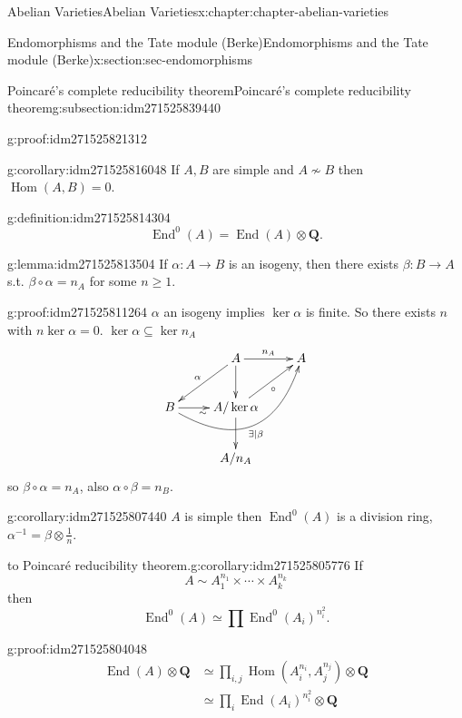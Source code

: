\documentclass[oneside,10pt,]{book}
\numberwithin{equation}{section}
\newcommand{\QQ}{\mathbf{Q}}
\DeclareMathOperator{\End}{End}
\DeclareMathOperator{\Hom}{Hom}
\newcommand{\amp}{&}
\begin{document}
\begin{chapterptx}{Abelian Varieties}{}{Abelian Varieties}{}{}{x:chapter:chapter-abelian-varieties}
\begin{sectionptx}{Endomorphisms and the Tate module (Berke)}{}{Endomorphisms and the Tate module (Berke)}{}{}{x:section:sec-endomorphisms}
\begin{subsectionptx}{Poincaré's complete reducibility theorem}{}{Poincaré's complete reducibility theorem}{}{}{g:subsection:idm271525839440}
\begin{proofptx}{}{g:proof:idm271525821312}
\end{proofptx}
\begin{corollary}{}{}{g:corollary:idm271525816048}%
If \(A,B\) are simple and  \(A\not\sim B\) then \(\Hom(A,B) = 0\).%
\end{corollary}
\begin{definition}{}{g:definition:idm271525814304}%
%
\begin{equation*}
\End^0(A) = \End(A) \otimes \QQ\text{.}
\end{equation*}
%
\end{definition}
\begin{lemma}{}{}{g:lemma:idm271525813504}%
If \(\alpha \colon A\to B\) is an isogeny, then there exists \(\beta \colon B\to A\) s.t. \(\beta \circ \alpha = n_A\) for some \(n \ge 1\).%
\end{lemma}
\begin{proofptx}{}{g:proof:idm271525811264}
\(\alpha\) an isogeny implies \(\ker \alpha\) is finite. So there exists \(n\) with \(n \ker \alpha = 0\). \(\ker\alpha \subseteq \ker n_A\)%
\begin{equation*}
\xymatrix{
& A \ar[dl]_\alpha \ar[d]\ar[r]^{n_A} & A \\
B\ar[r]_\sim \ar@/_3.0pc/[urr]_{\exists | \beta} & A/\ker\alpha \ar[d]\ar[ur]_{\circ} &\\
& A/n_A &
}
\end{equation*}
so \(\beta\circ \alpha = n_A\), also \(\alpha \circ \beta = n_B\).%
\end{proofptx}
\begin{corollary}{}{}{g:corollary:idm271525807440}%
\(A\) is simple then \(\End^0(A)\) is a division ring, \(\alpha^{-1} = \beta \otimes \frac 1n\).%
\end{corollary}
\begin{corollary}{to Poincaré reducibility theorem.}{}{g:corollary:idm271525805776}%
If%
\begin{equation*}
A\sim A_1^{n_1} \times \cdots \times A_k^{n_k}
\end{equation*}
then%
\begin{equation*}
\End^0(A) \simeq \prod \End^0(A_i)^{n_i^2}\text{.}
\end{equation*}
%
\end{corollary}
\begin{proofptx}{}{g:proof:idm271525804048}
%
\begin{align*}
\End(A) \otimes \QQ \amp \simeq \prod_{i,j} \Hom(A_i^{n_i}, A_j^{n_j}) \otimes \QQ\\
\amp \simeq \prod_{i} \End(A_i)^{n_i^2} \otimes \QQ\\

\end{align*}
\end{proofptx}
\end{subsectionptx}
\end{sectionptx}
\end{chapterptx}
\end{document}
